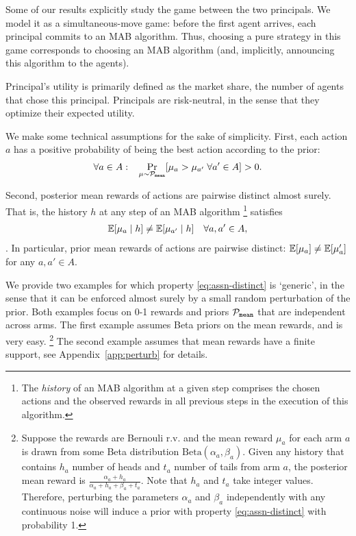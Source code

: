 Some of our results explicitly study the game between the two principals. We model it as a simultaneous-move game: before the first agent arrives, each principal commits to an MAB algorithm. Thus, choosing a pure strategy in this game corresponds to choosing an MAB algorithm (and, implicitly, announcing this algorithm to the agents).

Principal's utility is primarily defined as the market share, \ie the number of agents that chose this principal. Principals are risk-neutral, in the sense that they optimize their expected utility.

 We make some technical assumptions for the sake of simplicity. First, each action $a$ has a positive probability of being the best action according to the prior:
\begin{align}\label{eq:assn-prob}
\forall a\in A:\;\;\;  \Pr_{\mu\sim \mathcal{P}_\mathtt{mean}}[\mu_a  > \mu_{a'}
\;\forall a'\in A]
> 0.
\end{align}

Second, posterior mean rewards of actions are pairwise distinct almost
surely. That is, the history $h$ at any step of an MAB algorithm%
\footnote{The \emph{history} of an MAB algorithm at a given step
  comprises the chosen actions and the observed rewards in all
  previous steps in the execution of this algorithm.}
 satisfies
\begin{align}\label{eq:assn-distinct}
    \E[\mu_a \mid h] \neq \E[\mu_{a'}\mid h] \quad \forall a,a'\in A,
\end{align}
.  In
particular, prior mean rewards of actions are pairwise distinct:
$\E[\mu_a] \neq \E[\mu_a']$ for any $a,a'\in A$. 

We provide two examples for which property \eqref{eq:assn-distinct} is `generic', in the sense that it can be enforced almost surely by a
  small random perturbation of the prior. Both examples focus on 0-1 rewards and priors $\mathcal{P}_\mathtt{mean}$ that are independent across arms. The first example
  assumes Beta priors on the mean rewards, and is very easy.%
  \footnote{Suppose the rewards are Bernouli r.v. and the mean reward
    $\mu_a$ for each arm $a$ is drawn from some Beta distribution
    $\text{Beta}(\alpha_a, \beta_a)$. Given any history that contains
    $h_a$ number of heads and $t_a$ number of tails from arm $a$, the
    posterior mean reward is
    $\frac{\alpha_a + h_a}{\alpha_a + h_a + \beta_a + t_a}$. Note that
    $h_a$ and $t_a$ take integer values. Therefore, perturbing the
    parameters $\alpha_a$ and $\beta_a$ independently with any
    continuous noise will induce a prior with property
    \eqref{eq:assn-distinct} with probability 1.  }  The second
  example assumes that mean rewards have a
  finite support, see Appendix~\ref{app:perturb} for details.

